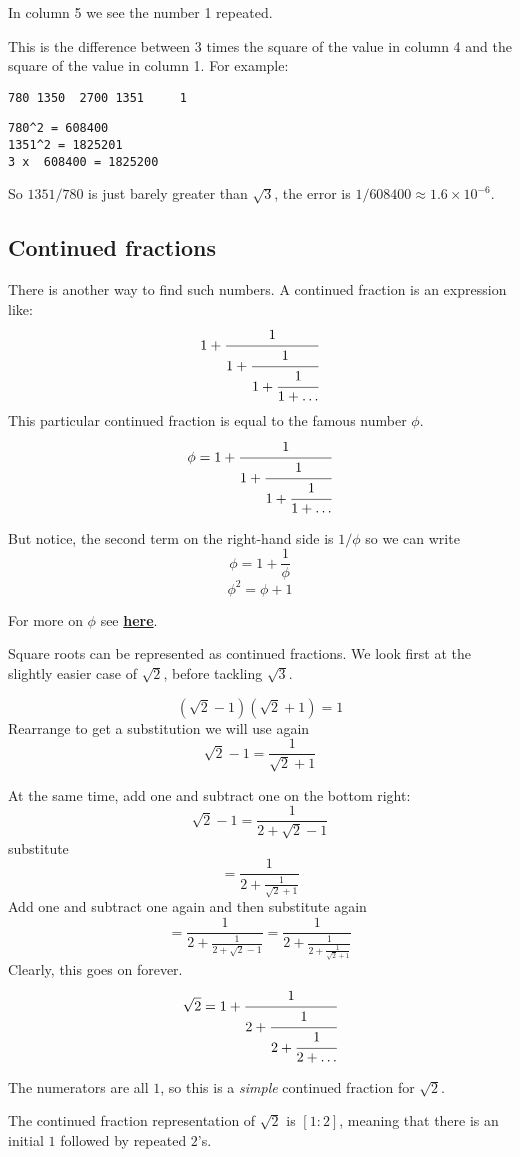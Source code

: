 \documentclass[11pt, oneside]{article}
\begin{document}
In column 5 we see the number 1 repeated.  

This is the difference between 3 times the square of the value in column 4 and the square of the value in column 1.  For example:

\begin{verbatim}
780 1350  2700 1351     1
\end{verbatim}

\begin{verbatim}
780^2 = 608400
1351^2 = 1825201
3 x  608400 = 1825200
\end{verbatim}

So $1351/780$ is just barely greater than $\sqrt{3}$, the error is $1/608400 \approx 1.6 \times 10^{-6}$.

\subsection*{Continued fractions}
There is another way to find such numbers.  A continued fraction is an expression like:
\[ 1 + \cfrac{1}{1 + \cfrac{1}{1 + \cfrac{1}{1 + \dots}}}  \]
This particular continued fraction is equal to the famous number $\phi$. 
\[ \phi = 1 + \cfrac{1}{1 + \cfrac{1}{1 + \cfrac{1}{1 + \dots}}}  \]

But notice, the second term on the right-hand side is $1/\phi$ so we can write
\[ \phi = 1 + \frac{1}{\phi} \]
\[ \phi^2 = \phi + 1 \]

For more on $\phi$ see \hyperref[sec:fibonacci]{\textbf{here}}.

Square roots can be represented as continued fractions.  We look first at the slightly easier case of $\sqrt{2}$, before tackling $\sqrt{3}$.

\[ (\sqrt{2} - 1)(\sqrt{2} + 1) = 1 \]
Rearrange to get a substitution we will use again
\[ \sqrt{2} - 1 = \frac{1}{\sqrt{2} + 1} \]

At the same time, add one and subtract one on the bottom right:
\[ \sqrt{2} - 1 =  \frac{1}{2 + \sqrt{2} - 1} \]
substitute
\[ = \frac{1}{2 + \frac{1}{\sqrt{2} + 1}} \]
Add one and subtract one again and then substitute again
\[ = \frac{1}{2 + \frac{1}{2 + \sqrt{2} - 1}} = \frac{1}{2 + \frac{1}{2 + \frac{1}{\sqrt{2} + 1} }} \]
Clearly, this goes on forever.
\[ \sqrt{2} = 1 + \cfrac{1}{2+\cfrac{1}{2+\cfrac{1}{2 + \dots}}}  \]

The numerators are all $1$, so this is a \emph{simple} continued fraction for $\sqrt{2}$.

The continued fraction representation of $\sqrt{2}$ is $[1:2]$, meaning that there is an initial $1$ followed by repeated $2$'s.
\end{document}
